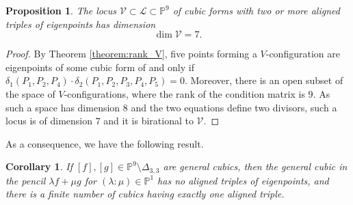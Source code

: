 \documentclass{amsart}
\theoremstyle{plain}
\newtheorem{prop}[lemma]{Proposition}
\newtheorem{corollary}[lemma]{Corollary}
\theoremstyle{definition}
\newtheorem{definition}[lemma]{Definition}
\newcommand{\p}{\mathbb{P}}
\newcommand{\sL}{\mathcal{L}}
\newcommand{\sV}{\mathcal{V}}
\begin{document}
\begin{prop}
    The locus $\sV \subset \sL \subset \p^9$ of cubic forms with two or more aligned triples of eigenpoints has dimension
    $$
    \dim \sV=7.
    $$
\end{prop}
\begin{proof}
   By Theorem \ref{theorem:rank_V}, five points forming a $V$-configuration are eigenpoints of some cubic form of and only if $\delta_1 (P_1,P_2,P_4) \cdot
   \delta_2 (P_1,P_2,P_3,P_4,P_5)=0$. Moreover, there is an open subset of the space of $V$-configurations, where the rank of the condition matrix is $9$. As such a space has dimension $8$ and the two equations define two divisors, such a locus is of dimension $7$ and it is birational to $\sV$.
\end{proof}
 As a consequence, we have the following result.
\begin{corollary}
\label{lemma:pencil_one_aligned}
 If $[f],[g] \in \p^9 \setminus \Delta_{3,3}$ are general cubics,
 then the general cubic in the pencil
 $\lambda f + \mu g$ for $(\lambda: \mu) \in \p^1$ has no aligned triples of eigenpoints, and there is a finite number of cubics having exactly one aligned triple.
\end{corollary}





%
\end{document}
